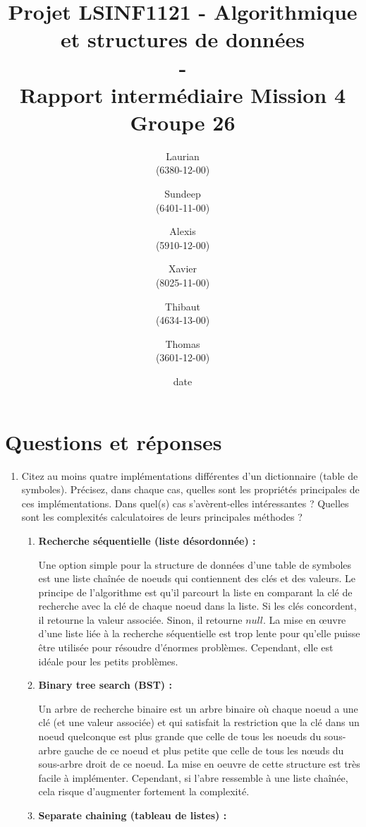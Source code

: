 \documentclass[11pt]{article}
\title{\textbf{Projet LSINF1121 -  Algorithmique et structures de données\\ - \\ Rapport intermédiaire Mission 4} \\ {\large Groupe 26}}
\author{Laurian \bsc{Detiffe} \\(6380-12-00)\and Sundeep \bsc{Dhillon} \\(6401-11-00)\and Alexis \bsc{Macq} \\ (5910-12-00) \and Xavier \bsc{Pérignon} \\ (8025-11-00)\and Thibaut \bsc{Piquard}\\(4634-13-00)\and Thomas \bsc{Wyckmans} \\ (3601-12-00)}
\date{date}
\date{\vspace*{25mm}
\texttt{[image: logo.jpg]}\\
		\vspace*{30mm}
		\begin{center}
		Année académique 2015-2016 \\	
		\end{center}}
\begin{document}
\thispagestyle{empty}

\maketitle
\thispagestyle{empty}

\section*{Questions et réponses}
\begin{enumerate}
\item Citez au moins quatre implémentations différentes d’un dictionnaire (table de
symboles). Précisez, dans chaque cas, quelles sont les propriétés principales
de ces implémentations. Dans quel(s) cas s’avèrent-elles intéressantes ? Quelles
sont les complexités calculatoires de leurs principales méthodes ?\\
\begin{enumerate}
\item \textbf{Recherche séquentielle (liste désordonnée) :}

Une option simple pour la structure de données d'une table de symboles est une liste chaînée de noeuds qui contiennent des clés et des valeurs. Le principe de l'algorithme est qu'il parcourt la liste en comparant la clé de recherche avec la clé de chaque noeud dans la liste. Si les clés concordent, il retourne la valeur associée. Sinon, il retourne $null$. La mise en œuvre d'une liste liée à la recherche séquentielle est trop lente pour qu'elle puisse être utilisée pour résoudre d'énormes problèmes. Cependant, elle est idéale pour les petits problèmes.

\item \textbf{Binary tree search (BST) :}

Un arbre de recherche binaire est un arbre binaire où chaque noeud a une clé (et une valeur associée) et qui satisfait la restriction que la clé dans un noeud quelconque est plus grande que celle de tous les noeuds du sous-arbre gauche de ce noeud et plus petite que celle de tous les nœuds du sous-arbre droit de ce noeud. La mise en oeuvre de cette structure est très facile à implémenter. Cependant, si l'abre ressemble à une liste chaînée, cela risque d'augmenter fortement la complexité. 

\item \textbf{Separate chaining (tableau de listes) :}


\end{enumerate}
\end{enumerate}
\end{document}
